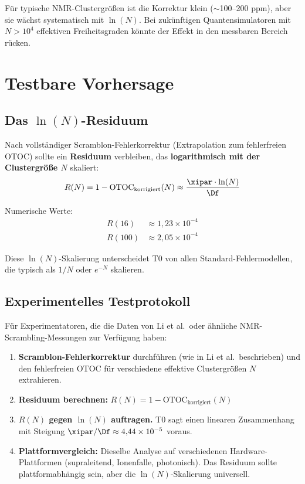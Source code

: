 \begin{remark}
	Für typische NMR-Clustergrößen ist die Korrektur klein ($\sim$100--200 ppm), aber sie wächst systematisch mit $\ln(N)$. Bei zukünftigen Quantensimulatoren mit $N > 10^4$ effektiven Freiheitsgraden könnte der Effekt in den messbaren Bereich rücken.
\end{remark}


\section{Testbare Vorhersage}
\label{sec:prediction}

\subsection{Das $\ln(N)$-Residuum}

\begin{experimentbox}
	Nach vollständiger Scramblon-Fehlerkorrektur (Extrapolation zum fehlerfreien OTOC) sollte ein \textbf{Residuum} verbleiben, das \textbf{logarithmisch mit der Clustergröße $N$} skaliert:
	\begin{equation}
		R(N) = 1 - \text{OTOC}_{\text{korrigiert}}(N) \approx \frac{\xipar \cdot \ln(N)}{\Df}
		\label{eq:residuum}
	\end{equation}
	
	Numerische Werte:
	\begin{align}
		R(16) &\approx 1{,}23 \times 10^{-4} \\
		R(100) &\approx 2{,}05 \times 10^{-4}
	\end{align}
	
	Diese $\ln(N)$-Skalierung unterscheidet T0 von allen Standard-Fehlermodellen, die typisch als $1/N$ oder $e^{-N}$ skalieren.
\end{experimentbox}

\subsection{Experimentelles Testprotokoll}

Für Experimentatoren, die die Daten von Li et al.\ oder ähnliche NMR-Scrambling-Messungen zur Verfügung haben:

\begin{enumerate}
	\item \textbf{Scramblon-Fehlerkorrektur} durchführen (wie in Li et al.\ beschrieben) und den fehlerfreien OTOC für verschiedene effektive Clustergrößen $N$ extrahieren.
	\item \textbf{Residuum berechnen:} $R(N) = 1 - \text{OTOC}_{\text{korrigiert}}(N)$
	\item \textbf{$R(N)$ gegen $\ln(N)$ auftragen.} T0 sagt einen linearen Zusammenhang mit Steigung $\xipar/\Df \approx 4{,}44 \times 10^{-5}$ voraus.
	\item \textbf{Plattformvergleich:} Dieselbe Analyse auf verschiedenen Hardware-Plattformen (supraleitend, Ionenfalle, photonisch). Das Residuum sollte plattformabhängig sein, aber die $\ln(N)$-Skalierung universell.
\end{enumerate}

